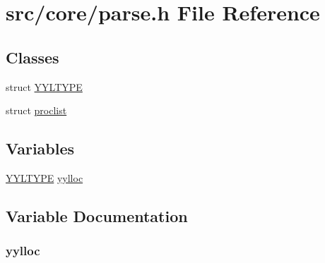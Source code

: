 \hypertarget{a00221}{\section{src/core/parse.h File Reference}
\label{a00221}
}
\subsection*{Classes}
\begin{DoxyCompactItemize}
\item 
struct \hyperlink{a00162}{Y\-Y\-L\-T\-Y\-P\-E}
\item 
struct \hyperlink{a00119}{proclist}
\end{DoxyCompactItemize}
\subsection*{Variables}
\begin{DoxyCompactItemize}
\item 
\hyperlink{a00162}{Y\-Y\-L\-T\-Y\-P\-E} \hyperlink{a00221_a09a8417463b1230407082c17db291e32}{yylloc}
\end{DoxyCompactItemize}


\subsection{Variable Documentation}
\hypertarget{a00221_a09a8417463b1230407082c17db291e32}{
\subsubsection[{yylloc}]{ yylloc}}\label{a00221_a09a8417463b1230407082c17db291e32}

